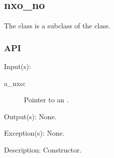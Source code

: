 %
%
%
%
%              

\subsection{nxo\_no}
\label{nxo_no}

The  class is a subclass of the  class.

\subsubsection{API}
\begin{capi}
\label{nxo_no_new}
	\begin{capilist}
	\item[Input(s): ]
		\begin{description}\item[]
		\item[a\_nxo: ]
			Pointer to an .
		\end{description}
	\item[Output(s): ] None.
	\item[Exception(s): ] None.
	\item[Description: ]
		Constructor.
	\end{capilist}
\end{capi}
